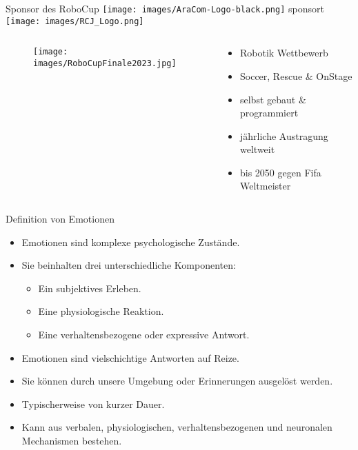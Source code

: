 \documentclass[aspectratio=169]{beamer}
\begin{document}
\begin{frame}{Sponsor des RoboCup}
  \texttt{[image: images/AraCom-Logo-black.png]} sponsort
  \texttt{[image: images/RCJ\_Logo.png]}
  \begin{columns}
    \begin{column}{0.45\textwidth}
      \begin{figure}[h]
        \centering
        \texttt{[image: images/RoboCupFinale2023.jpg]}
      \end{figure}
    \end{column}
    \begin{column}{0.45\textwidth}
      \begin{itemize}
        \item Robotik Wettbewerb
        \item Soccer, Rescue \& OnStage
        \item selbst gebaut \& programmiert
        \item jährliche Austragung weltweit
        \item bis 2050 gegen Fifa Weltmeister
      \end{itemize}
    \end{column}
  \end{columns}
\end{frame}

\begin{frame}{Definition von Emotionen}
  \begin{itemize}
      \item Emotionen sind komplexe psychologische Zustände.
      \item Sie beinhalten drei unterschiedliche Komponenten:
      \begin{itemize}
          \item Ein subjektives Erleben.
          \item Eine physiologische Reaktion.
          \item Eine verhaltensbezogene oder expressive Antwort.
      \end{itemize}
      \item Emotionen sind vielschichtige Antworten auf Reize.
      \item Sie können durch unsere Umgebung oder Erinnerungen ausgelöst werden.
      \item Typischerweise von kurzer Dauer.
      \item Kann aus verbalen, physiologischen, verhaltensbezogenen und neuronalen Mechanismen bestehen.
  \end{itemize}
\end{frame}
\end{document}

